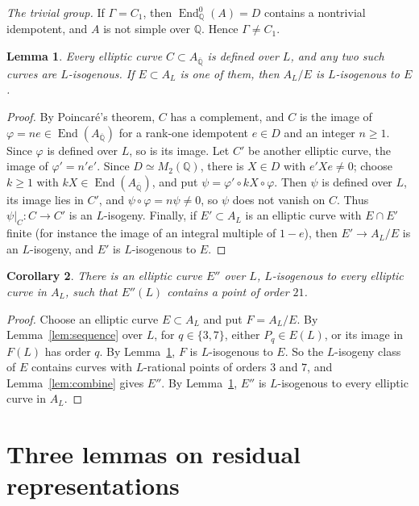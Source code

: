 \documentclass[11pt]{article}
\newtheorem{lemma}{Lemma}
\newtheorem{corollary}[lemma]{Corollary}
\newcommand{\Q}{\mathbb Q}
\DeclareMathOperator{\End}{End}
\begin{document}
\emph{The trivial group.} If \(\Gamma=C_1\), then \(\End^0_{\Q}(A)=D\)
contains a nontrivial idempotent, and \(A\) is not simple over \(\Q\).
Hence \(\Gamma\neq C_1\).

\begin{lemma}\label{lem:subvarieties}
Every elliptic curve \(C\subset A_{\overline{\Q}}\) is defined over
\(L\), and any two such curves are \(L\)-isogenous. If \(E\subset A_L\)
is one of them, then \(A_L/E\) is \(L\)-isogenous to \(E\).
\end{lemma}

\begin{proof}
By Poincar\'e's theorem, \(C\) has a complement, and \(C\) is the image
of \(\varphi=ne\in\End(A_{\overline{\Q}})\) for a rank-one idempotent
\(e\in D\) and an integer \(n\geq1\). Since \(\varphi\) is defined over
\(L\), so is its image. Let \(C'\) be another elliptic curve, the image
of \(\varphi'=n'e'\). Since \(D\simeq M_2(\Q)\), there is \(X\in D\)
with \(e'Xe\neq0\); choose \(k\geq1\) with
\(kX\in\End(A_{\overline{\Q}})\), and put
\(\psi=\varphi'\circ kX\circ\varphi\). Then \(\psi\) is defined over
\(L\), its image lies in \(C'\), and \(\psi\circ\varphi=n\psi\neq0\), so
\(\psi\) does not vanish on \(C\). Thus \(\psi|_C:C\to C'\) is an
\(L\)-isogeny. Finally, if \(E'\subset A_L\) is an elliptic curve with
\(E\cap E'\) finite (for instance the image of an integral multiple of
\(1-e\)), then \(E'\to A_L/E\) is an \(L\)-isogeny, and \(E'\) is
\(L\)-isogenous to \(E\).
\end{proof}

\begin{corollary}\label{cor:21}
There is an elliptic curve \(E''\) over \(L\), \(L\)-isogenous to every
elliptic curve in \(A_L\), such that \(E''(L)\) contains a point of
order \(21\).
\end{corollary}

\begin{proof}
Choose an elliptic curve \(E\subset A_L\) and put \(F=A_L/E\). By
Lemma~\ref{lem:sequence} over \(L\), for \(q\in\{3,7\}\), either
\(P_q\in E(L)\), or its image in \(F(L)\) has order \(q\). By
Lemma~\ref{lem:subvarieties}, \(F\) is \(L\)-isogenous to \(E\). So the
\(L\)-isogeny class of \(E\) contains curves with \(L\)-rational points
of orders \(3\) and \(7\), and Lemma~\ref{lem:combine} gives \(E''\). By
Lemma~\ref{lem:subvarieties}, \(E''\) is \(L\)-isogenous to every
elliptic curve in \(A_L\).
\end{proof}

\section{Three lemmas on residual representations}\label{sec:residual}
\end{document}
